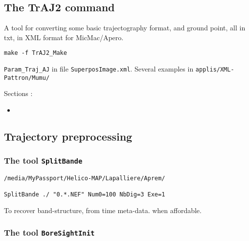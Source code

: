 \subsection{The TrAJ2 command}

A tool for converting some basic trajectography format, and ground point,
all in txt, in XML format for MicMac/Apero.


{\tt make -f TrAJ2\_Make}

{\tt Param\_Traj\_AJ} in file {\tt SuperposImage.xml}. Several examples in
{\tt applis/XML-Pattron/Mumu/}



Sections :

\begin{itemize}
   \item
\end{itemize}


\subsection{Trajectory preprocessing}

\subsubsection{The tool {\tt SplitBande}}


\begin{verbatim}
/media/MyPassport/Helico-MAP/Lapalliere/Aprem/

SplitBande ./ "0.*.NEF" Num0=100 NbDig=3 Exe=1
\end{verbatim}





To recover band-structure, from time meta-data. when affordable.


\subsubsection{The tool {\tt BoreSightInit}}











